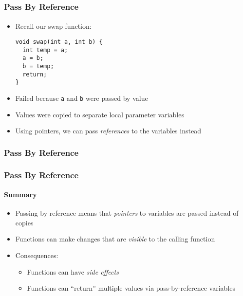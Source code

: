 \documentclass[]{beamer}
\begin{document}
\begin{frame}[fragile]
  \frametitle{Pass By Reference}
  \framesubtitle{}

\begin{itemize}[<+->]
  \item Recall our swap function:
\begin{verbatim}
void swap(int a, int b) {
  int temp = a;
  a = b;
  b = temp;
  return;
}
\end{verbatim}
  \item Failed because \texttt{a} and \texttt{b} were passed
  by value
  \item Values were copied to separate local parameter variables
  \item Using pointers, we can pass \emph{references} to the variables instead
  
\end{itemize}

\end{frame}

\begin{frame}[fragile]
  \frametitle{Pass By Reference}
  \framesubtitle{}
  

\end{frame}

\begin{frame}[fragile]
  \frametitle{Pass By Reference}
  \framesubtitle{Summary}

\begin{itemize}[<+->]
  \item Passing by reference means that \emph{pointers} to variables are passed
  instead of copies
  \item Functions can make changes that are \emph{visible} to the calling function
  \item Consequences: 
  \begin{itemize}
    \item Functions can have \emph{side effects}
    \item Functions can ``return'' multiple values via pass-by-reference variables
  \end{itemize}
\end{itemize}
  
\end{frame}
\end{document}
